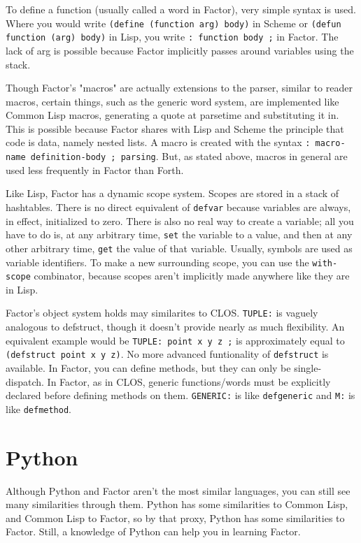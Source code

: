 \documentclass{article}
\begin{document}
To define a function (usually called a word in Factor), very simple syntax is used. Where you would write \verb|(define (function arg) body)| in Scheme or \verb|(defun function (arg) body)| in Lisp, you write \verb|: function body ;| in Factor. The lack of arg is possible because Factor implicitly passes around variables using the stack.

Though Factor's "macros" are actually extensions to the parser, similar to reader macros, certain things, such as the generic word system, are implemented like Common Lisp macros, generating a quote at parsetime and substituting it in. This is possible because Factor shares with Lisp and Scheme the principle that code is data, namely nested lists. A macro is created with the syntax \verb|: macro-name definition-body ; parsing|. But, as stated above, macros in general are used less frequently in Factor than Forth.

Like Lisp, Factor has a dynamic scope system. Scopes are stored in a stack of hashtables. There is no direct equivalent of \texttt{defvar} because variables are always, in effect, initialized to zero. There is also no real way to create a variable; all you have to do is, at any arbitrary time, \texttt{set} the variable to a value, and then at any other arbitrary time, \texttt{get} the value of that variable. Usually, symbols are used as variable identifiers. To make a new surrounding scope, you can use the \texttt{with-scope} combinator, because scopes aren't implicitly made anywhere like they are in Lisp.

Factor's object system holds may similarites to CLOS. \texttt{TUPLE:} is vaguely analogous to defstruct, though it doesn't provide nearly as much flexibility. An equivalent example would be \verb|TUPLE: point x y z ;| is approximately equal to \verb|(defstruct point x y z)|. No more advanced funtionality of \texttt{defstruct} is available. In Factor, you can define methods, but they can only be single-dispatch. In Factor, as in CLOS, generic functions/words must be explicitly declared before defining methods on them. \texttt{GENERIC:} is like \texttt{defgeneric} and \texttt{M:} is like \texttt{defmethod}.

\section{Python}

Although Python and Factor aren't the most similar languages, you can still see many similarities through them. Python has some similarities to Common Lisp, and Common Lisp to Factor, so by that proxy, Python has some similarities to Factor. Still, a knowledge of Python can help you in learning Factor.
\end{document}
